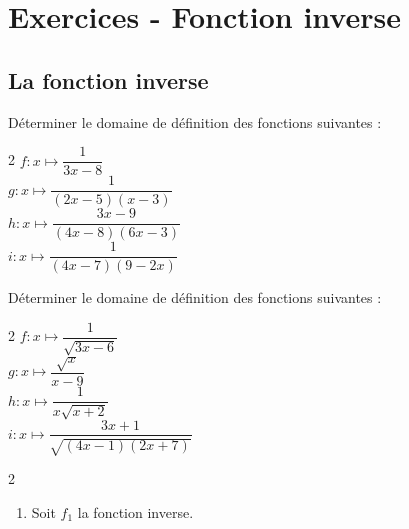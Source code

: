 \bigskip

\newpage

\section*{Exercices - Fonction inverse}
{\setlength{\columnseprule}{0pt}
\setcounter{NumEx}{1}





\subsection*{La fonction inverse}

\begin{Exercice}
Déterminer le domaine de définition des fonctions suivantes :
\vspace{-0.5cm}
\begin{multicols}{2}
$ f : x \mapsto \dfrac{1}{3x - 8} $\\

$ g : x \mapsto \dfrac{1}{(2x - 5)(x - 3)} $\\

$ h : x \mapsto \dfrac{3x - 9}{(4x - 8)(6x - 3)} $\\

$ i : x \mapsto \dfrac{1}{(4x - 7)(9 - 2x)} $
\end{multicols}
\end{Exercice}

\begin{Exercice}
Déterminer le domaine de définition des fonctions suivantes :
\vspace{-0.5cm}
\begin{multicols}{2}
$f : x \mapsto \dfrac{1}{\sqrt{3x - 6}} $\\

$ g : x \mapsto \dfrac{\sqrt{x}}{x - 9}  $\\

$ h : x \mapsto \dfrac{1}{x\sqrt{x + 2}} $\\

$ i : x \mapsto \dfrac{3x + 1}{\sqrt{(4x - 1)(2x + 7)}} $
\end{multicols}
\end{Exercice}


\begin{Exercice}
\leavevmode\vspace{-\baselineskip}
\vspace{-0.5cm}
\begin{multicols}{2}
\begin{enumerate}[itemsep=1em]
	\item \begin{minipage}[t]{\linewidth}Soit $f_1$ la fonction inverse.\\
      

\end{minipage}
\end{enumerate}
\end{multicols}
\end{Exercice}}
